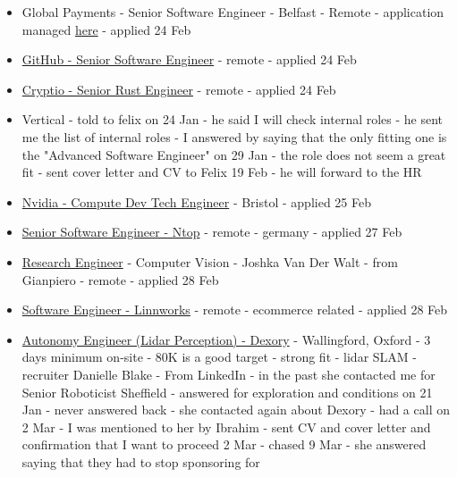 \begin{itemize}
  \item Global Payments - Senior Software Engineer - Belfast - Remote - application managed 
    \href{http://tsys.wd1.myworkdayjobs.com/en-US/tsys/userHome}{here} - applied 24 Feb
  \item
    \href{https://globalcareers-githubinc.icims.com/jobs/5059/senior-software-engineer/job?mode=submit_apply}{GitHub
    - Senior Software Engineer} - remote -  applied 24 Feb
  \item
    \href{https://cryptio.co/careers?ashby_jid=bb9dae83-636c-4b8a-8c96-b4233eade222#open-roles}{Cryptio
    - Senior Rust Engineer} - remote - applied 24 Feb
  \item
    Vertical - told to felix on 24 Jan - he said I will check internal roles -
    he sent me the list of internal roles - I answered by saying that the only
    fitting one is the "Advanced Software Engineer" on 29 Jan - the role does
    not seem a great fit - sent cover letter and CV to Felix 19 Feb - he will
    forward to the HR
  \item
    \href{https://nvidia.wd5.myworkdayjobs.com/en-US/NVIDIAExternalCareerSite/job/Compute-DevTech-Engineer_JR2011749}{Nvidia
    - Compute Dev Tech Engineer} - Bristol - applied 25 Feb
  \item
    \href{https://jobs.gem.com/ntop/am9icG9zdDqwOzqEyqs3X59TogF_iDLV}{Senior
    Software Engineer - Ntop} - remote - germany - applied 27 Feb
  \item
    \href{https://www.robertwalters.co.uk/technologydigital/jobs/datascienceairesearch/1808934-research-engineer.html}{Research
    Engineer} - Computer Vision - Joshka Van Der Walt - from Gianpiero - remote
    - applied 28 Feb
  \item
    \href{https://linnworks.bamboohr.com/careers/316}{Software Engineer -
    Linnworks} - remote - ecommerce related - applied 28 Feb
  \item
    \href{https://www.dexory.com/about-us}{Autonomy Engineer (Lidar Perception)
    - Dexory} - Wallingford, Oxford - 3 days minimum on-site - 80K is a good
    target - strong fit - lidar SLAM - recruiter Danielle Blake - From LinkedIn
    - in the past she contacted me for Senior Roboticist Sheffield - answered
    for exploration and conditions on 21 Jan - never answered back - she contacted
    again about Dexory - had a call on 2 Mar - I was mentioned to her by Ibrahim -
    sent CV and cover letter and confirmation that I want to proceed 2 Mar -
    chased 9 Mar - she answered saying that they had to stop sponsoring for

\end{itemize}
